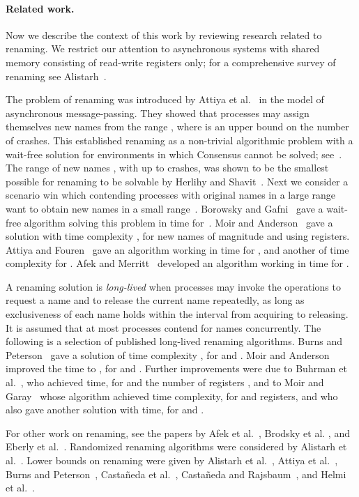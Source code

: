 \documentclass[11pt]{article}
\newcommand{\BBB}{\vspace*{-\bigskipamount}}
\newcommand{\Paragraph}[1]{\BBB\paragraph{#1}}
\begin{document}
\Paragraph{Related work.}



Now we describe the context of this work by reviewing research related to renaming.
We restrict our attention to asynchronous systems with shared memory consisting of read-write registers only; for a comprehensive survey of renaming see Alistarh~\cite{Alistarh15}.

The problem of renaming was introduced by Attiya et al.~\cite{AttiyaBDPR90} in the model of asynchronous message-passing. 
They showed that  processes may assign themselves new names from the range , where  is an upper bound on the number of crashes.
This established renaming as a non-trivial algorithmic problem with a wait-free solution for  environments in which Consensus cannot be solved; see~\cite{Attiya-Welch-book2004,HerlihyKozlovRajsbaum-book,Lynch-book96}.
The range of new names , with up to  crashes, was shown to be the smallest possible for renaming to be solvable by Herlihy and Shavit~\cite{HerlihyS99}.
Next we consider a scenario win which  contending processes with original names in a large range~ want to obtain new names in a small range~.
Borowsky and Gafni~\cite{BorowskyG92} gave a wait-free algorithm solving this problem in  time  for~.
Moir and Anderson~\cite{MoirA95} gave a solution with time complexity , for new names of magnitude  and using  registers. 
Attiya and Fouren~\cite{AttiyaF01} gave an algorithm working in time  for , and another of time complexity  for . 
Afek and Merritt~\cite{AfekM99} developed an algorithm working in time  for .

A  renaming solution is \emph{long-lived} when processes may invoke the operations to request a name and to release the current name repeatedly, as long as exclusiveness of each name holds within the interval from acquiring to releasing.
It is assumed that at most  processes contend for names concurrently.
The following is a selection of published long-lived renaming algorithms.
Burns and Peterson~\cite{BurnsP89} gave a solution of time complexity  , for  and .
Moir and Anderson~\cite{MoirA95}  improved the time to , for  and .
Further improvements were due to Buhrman et al.~\cite{BuhrmanGHM95}, who achieved  time, for  and the  number of registers , and to Moir and Garay~\cite{MoirG96} whose algorithm achieved  time complexity, for  and  registers, and who also gave another solution with  time, for  and .	

For other work on renaming, see the papers by Afek et al.~\cite{AfekAFST99,AfekBT00,AfekST02}, Brodsky et al. \cite{BrodskyEW06}, and Eberly et al.~\cite{EberlyHW98}.
Randomized renaming algorithms were considered by Alistarh et al.~\cite{AlistarhACGZ11, AlistarhAGW13, AlistarhAGGG10}.
Lower bounds on renaming were given by Alistarh et al.~\cite{AlistarhACGG14}, Attiya et al.~\cite{AttiyaCHP19,AttiyaP16,AttiyaR02}, Burns and Peterson~\cite{BurnsP89}, Casta\~neda et al.~\cite{CastanedaHR14}, Casta\~neda and Rajsbaum~\cite{CastanedaR10,CastanedaR12}, and Helmi et al.~\cite{HelmiHW14}.
\end{document}

